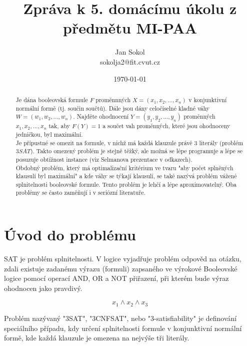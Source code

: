 \documentclass[a4paper,10pt,twocolumn]{article}
\title{Zpráva k 5. domácímu úkolu z předmětu MI-PAA}
\date{\today}
\author{Jan Sokol \\ sokolja2@fit.cvut.cz}
\begin{document}
\maketitle
\begin{abstract}

Je dána booleovská formule $F$ proměnnných $X=(x_1, x_2, ... , x_n)$ v konjunktivní normální formě (tj. součin součtů). Dále jsou dány celočíselné kladné váhy $W=(w_1, w_2, ... , w_n)$. Najděte ohodnocení $Y=(y_1, y_2, ... , y_n)$ proměnných $x_1, x_2, ... , x_n$ tak, aby $F(Y)=1$ a součet vah proměnných, které jsou ohodnoceny jedničkou, byl maximální. \\

Je přípustné se omezit na formule, v nichž má každá klauzule právě 3 literály (problém $3 SAT$). Takto omezený problém je stejně těžký, ale možná se lépe programuje a lépe se posuzuje obtížnost instance (viz Selmanova prezentace v odkazech).\\
Obdobný problém, který má optimalizační kritérium ve tvaru "aby počet splněných klausulí byl maximální" a kde váhy se týkají klausulí, se také nazývá problém vážené splnitelnosti booleovské formule. Tento problém je lehčí a lépe aproximovatelný. Oba problémy se často zaměňují i v seriózní literatuře.

\end{abstract}


\section{Úvod do problému}

SAT je problém splnitelnosti. V logice vyjadřuje problém odpověd na otázku, zdali existuje zadanému výrazu (formuli) zapsaného ve výrokové Booleovské logice pomocí operací AND, OR a NOT přiřazení, při kterém bude výraz ohodnocen jako pravdivý.

$$
x_1\land x_2\land x_3
$$

Problém nazývaný "3SAT", "3CNFSAT", nebo "3-satisfiability" je definování speciálního případu, kdy určení splnitelnosti formule v konjunktivní normální formě, kde každá klauzule je omezena na nejvýše tři literály.
\end{document}
